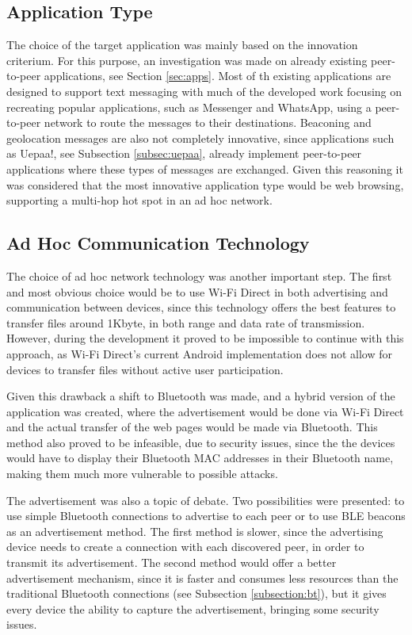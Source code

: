 \subsection{Application Type}

The choice of the target application was mainly based on the innovation criterium. For this purpose, an investigation was made on already existing peer-to-peer applications, see Section \ref{sec:apps}. Most of th existing applications are designed to support text messaging with much of the developed work focusing on recreating popular applications, such as Messenger and WhatsApp, using a peer-to-peer network to route the messages to their destinations. Beaconing and geolocation messages are also not completely innovative, since applications such as Uepaa!, see Subsection \ref{subsec:uepaa}, already implement peer-to-peer applications where these types of messages are exchanged. Given this reasoning it was considered that the most innovative application type would be web browsing, supporting a multi-hop hot spot in an ad hoc network.

\subsection{Ad Hoc Communication Technology}

The choice of ad hoc network technology was another important step. The first and most obvious choice would be to use Wi-Fi Direct in both advertising and communication between devices, since this technology offers the best features to transfer files around 1Kbyte, in both range and data rate of transmission. However, during the development it proved to be impossible to continue with this approach, as Wi-Fi Direct's current Android implementation does not allow for devices to transfer files without active user participation.

Given this drawback a shift to Bluetooth was made, and a hybrid version of the application was created, where the advertisement would be done via Wi-Fi Direct and the actual transfer of the web pages would be made via Bluetooth. This method also proved to be infeasible, due to security issues, since the the devices would have to display their Bluetooth MAC addresses in their Bluetooth name, making them much more vulnerable to possible attacks.

The advertisement was also a topic of debate. Two possibilities were presented: to use simple Bluetooth connections to advertise to each peer or to use \gls{BLE} beacons as an advertisement method. The first method is slower, since the advertising device needs to create a connection with each discovered peer, in order to transmit its advertisement. The second method would offer a better advertisement mechanism, since it is faster and consumes less resources than the traditional Bluetooth connections (see Subsection \ref{subsection:bt}), but it gives every device the ability to capture the advertisement, bringing some security issues.

